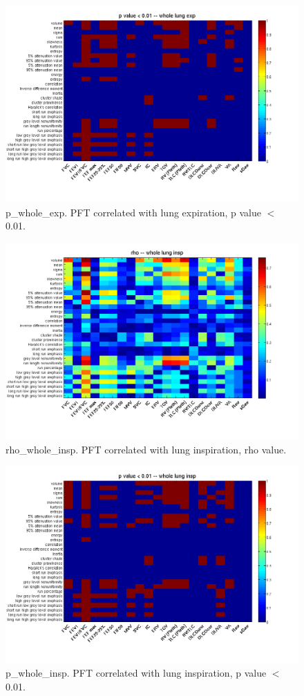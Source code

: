 \documentclass[12pt]{article}
\begin{document}
\begin{figure}
 \includegraphics[width=0.9\linewidth,viewport=100 60 620 520]{p_whole_exp.png}
 \caption{p\_whole\_exp. PFT correlated with lung expiration, p value $<$ 0.01.}
\end{figure}

\begin{figure}
 \includegraphics[width=0.9\linewidth,viewport=100 60 620 520]{rho_whole_insp.png}
 \caption{rho\_whole\_insp. PFT correlated with lung inspiration, rho value.}
\end{figure}

\begin{figure}
 \includegraphics[width=0.9\linewidth,viewport=100 60 620 520]{p_whole_insp.png}
 \caption{p\_whole\_insp. PFT correlated with lung inspiration, p value $<$ 0.01.}
\end{figure}
\end{document}
